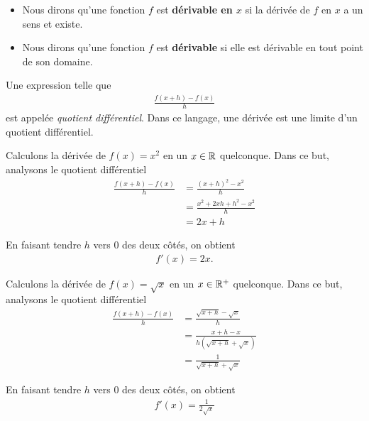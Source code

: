 \documentclass[main.tex]{subfiles}
\begin{document}
\begin{remark}
    [Dérivabilité]

    \begin{itemize}
        \item Nous dirons qu'une fonction $f$ est \textbf{dérivable en $x$}
            si la dérivée de $f$ en $x$ a un sens et existe.
        \item Nous dirons qu'une fonction $f$ est \textbf{dérivable}
            si elle est dérivable en tout point de son domaine.
    \end{itemize}
\end{remark}

\begin{remark}
    Une expression telle que
    \begin{align}
        \frac {f(x + h) - f(x)} h
    \end{align}
    est appelée \emph{quotient différentiel}.
    Dans ce langage,
    une dérivée est une limite d'un quotient différentiel.
\end{remark}

\begin{example}
    [Dérivée de $x^2$]

    Calculons la dérivée de $f(x) = x^2$ en un $x \in \mathbb{R}$ quelconque.
    Dans ce but,
    analysons le quotient différentiel
    \begin{align}
        \frac {f(x + h) - f(x)} h
        &= \frac {{(x + h)}^2 - x^2} h\\
        &= \frac {x^2 + 2xh + h^2 - x^2} h\\
        &= 2x + h
    \end{align}

    En faisant tendre $h$ vers $0$ des deux côtés,
    on obtient
    \begin{align}
        f'(x) = 2x.
    \end{align}
\end{example}

\begin{example}

    Calculons la dérivée de $f(x) = \sqrt x$ en un $x \in \mathbb{R}^+$ quelconque.
    Dans ce but,
    analysons le quotient différentiel
    \begin{align}
        \frac {f(x + h) - f(x)} h
        &= \frac {\sqrt {x + h} - \sqrt x} h\\
        &= \frac {x + h - x} {h (\sqrt {x + h} + \sqrt {x})}\\
        &= \frac 1 {\sqrt {x + h} + \sqrt {x}}
    \end{align}

    En faisant tendre $h$ vers $0$ des deux côtés,
    on obtient
    \begin{align}
        f'(x) = \frac 1 {2 \sqrt x}
    \end{align}
\end{example}
\end{document}
